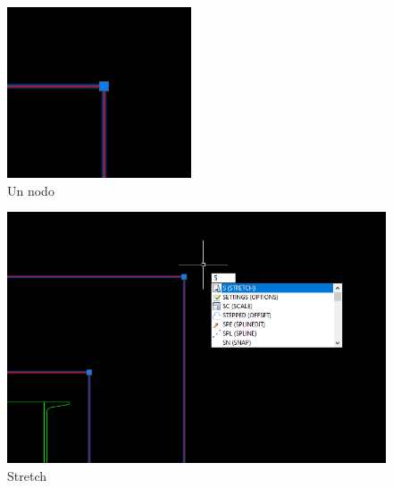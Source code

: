 \documentclass[12pt,letterpaper,final]{report}
\begin{document}
\begin{figure}[H]
	\centering
	\includegraphics[width=0.85\linewidth, height=0.5\textheight,keepaspectratio]{Imagenes/autocad_stretch01}
	\caption{Un nodo}
	\label{fig:autocadstretch01}
\end{figure}

\begin{figure}[H]
	\centering
	\includegraphics[width=0.85\linewidth, height=0.5\textheight,keepaspectratio]{Imagenes/autocad_stretch02}
	\caption{Stretch}
	\label{fig:autocadstretch02}
\end{figure}
\end{document}

